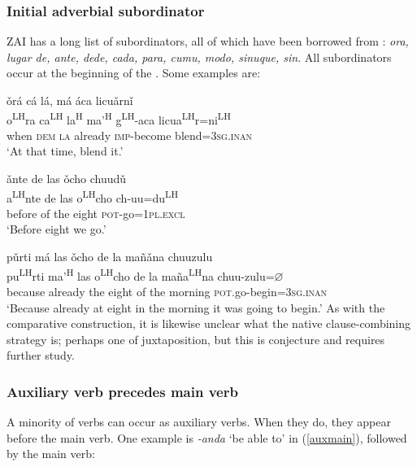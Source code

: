 \subsubsection{Initial adverbial subordinator}

ZAI has a long list of  subordinators, all of which have been borrowed from : \textit{ora, lugar de, ante, dede, cada, para, cumu, modo, sinuque, sin}. All  subordinators occur at the beginning of the . Some examples are:

\ea\label{ora}
\glll \v{o}r\'{a} c\'{a} l\'{a}, m\'{a} \'{a}ca licu\v{a}rn\v{i}  \\
o\textsuperscript{LH}ra ca\textsuperscript{LH} la\textsuperscript{H} ma'\textsuperscript{H} g\textsuperscript{LH}-aca licua\textsuperscript{LH}r=ni\textsuperscript{LH} \\
when \textsc{dem} \textsc{la} already \textsc{imp}-become blend=\textsc{3sg.inan} \\
\glt `At that time, blend it.'
\z

\ea\label{ante}
\glll \v{a}nte de las \v{o}cho chuud\v{u}  \\
a\textsuperscript{LH}nte de las o\textsuperscript{LH}cho ch-uu=du\textsuperscript{LH} \\
before of the eight \textsc{pot}-go=\textsc{1pl.excl} \\
\glt `Before eight we go.'
\z

\ea\label{purti}
\glll p\v{u}rti m\'{a} las \v{o}cho de la mañ\v{a}na chuuzulu \\
pu\textsuperscript{LH}rti ma'\textsuperscript{H} las o\textsuperscript{LH}cho de la maña\textsuperscript{LH}na chuu-zulu=$\varnothing$ \\
because already the eight of the morning \textsc{pot}.go-begin=\textsc{3sg.inan} \\
\glt `Because already at eight in the morning it was going to begin.'
\z
As with the comparative construction, it is likewise unclear what the native clause-combining strategy is; perhaps one of juxtaposition, but this is conjecture and requires further study.





\subsubsection{Auxiliary verb precedes main verb}
	
A minority of verbs can occur as auxiliary verbs. When they do, they appear before the main verb. One example is \textit{-anda} `be able to' in (\ref{auxmain}), followed by the main verb:

